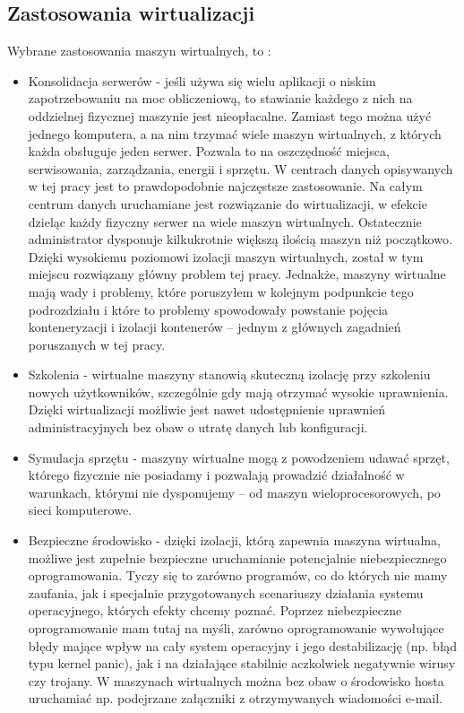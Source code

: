 \documentclass[10pt,a4paper,titlepage,twoside]{report}
\begin{document}
\subsection{Zastosowania wirtualizacji}\indent \indent Wybrane zastosowania maszyn wirtualnych, to \cite{ad15}:
\begin{itemize}
	\item Konsolidacja serwerów - jeśli używa się wielu aplikacji o niskim zapotrzebowaniu na moc obliczeniową, to stawianie każdego z nich na oddzielnej fizycznej maszynie jest nieopłacalne. Zamiast tego można użyć jednego komputera, a na nim trzymać wiele maszyn wirtualnych, z których każda obsługuje jeden serwer. Pozwala to na oszczędność miejsca, serwisowania, zarządzania, energii i sprzętu. W centrach danych opisywanych w tej pracy jest to prawdopodobnie najczęstsze zastosowanie. Na całym centrum danych uruchamiane jest rozwiązanie do wirtualizacji, w efekcie dzieląc każdy fizyczny serwer na wiele maszyn wirtualnych. Ostatecznie administrator dysponuje kilkukrotnie większą ilością maszyn niż początkowo. Dzięki wysokiemu poziomowi izolacji maszyn wirtualnych, został w tym miejscu rozwiązany główny problem tej pracy. Jednakże, maszyny wirtualne mają wady i problemy, które poruszyłem w kolejnym podpunkcie tego podrozdziału i które to problemy spowodowały powstanie pojęcia konteneryzacji i izolacji kontenerów – jednym z głównych zagadnień poruszanych w tej pracy.
	\item Szkolenia - wirtualne maszyny stanowią skuteczną izolację przy szkoleniu nowych użytkowników, szczególnie gdy mają otrzymać wysokie uprawnienia. Dzięki wirtualizacji możliwie jest nawet udostępnienie uprawnień administracyjnych bez obaw o utratę danych lub konfiguracji.
	\item Symulacja sprzętu - maszyny wirtualne mogą z powodzeniem udawać sprzęt, którego fizycznie nie posiadamy i pozwalają prowadzić działalność w warunkach, którymi nie dysponujemy – od maszyn wieloprocesorowych, po sieci komputerowe.
	\item Bezpieczne środowisko - dzięki izolacji, którą zapewnia maszyna wirtualna, możliwe jest zupełnie bezpieczne uruchamianie potencjalnie niebezpiecznego oprogramowania. Tyczy się to zarówno programów, co do których nie mamy zaufania, jak i specjalnie przygotowanych scenariuszy działania systemu operacyjnego, których efekty chcemy poznać. Poprzez niebezpieczne oprogramowanie mam tutaj na myśli, zarówno oprogramowanie wywołujące błędy mające wpływ na cały system operacyjny i jego destabilizację (np. błąd typu kernel panic), jak i na działające stabilnie aczkolwiek negatywnie wirusy czy trojany. W maszynach wirtualnych można bez obaw o środowisko hosta uruchamiać np. podejrzane załączniki z otrzymywanych wiadomości e-mail.

\end{itemize}
\end{document}
